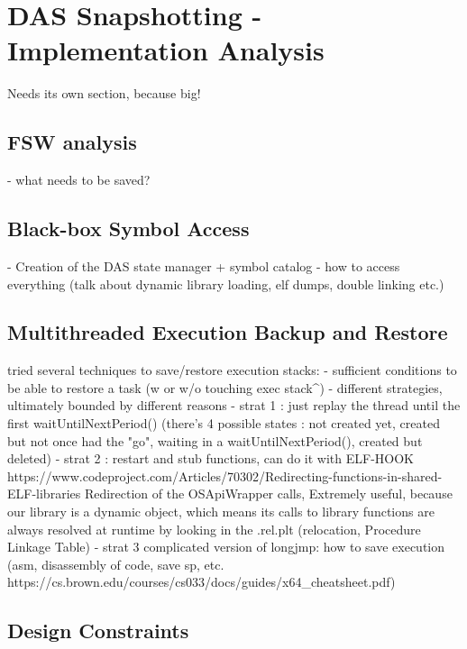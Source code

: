 {
\setlength{\parindent}{2em}
\chapter{DAS Snapshotting - Implementation Analysis}\label{cha:das-impl}
Needs its own section, because big!
\section{FSW analysis}
- what needs to be saved?
\section{Black-box Symbol Access}
- Creation of the DAS state manager + symbol catalog
- how to access everything (talk about dynamic library loading, elf dumps, double linking etc.)
\section{Multithreaded Execution Backup and Restore}
tried several techniques to save/restore execution stacks:
- sufficient conditions to be able to restore a task (w or w/o touching exec stack^)
- different strategies, ultimately bounded by different reasons 
- strat 1 : just replay the thread until the first waitUntilNextPeriod() (there's 4 possible states : not created yet, created but not once had the "go", waiting in a waitUntilNextPeriod(), created but deleted)
- strat 2 : restart and stub functions, can do it with ELF-HOOK https://www.codeproject.com/Articles/70302/Redirecting-functions-in-shared-ELF-libraries
	Redirection of the OSApiWrapper calls, Extremely useful, because our library is a dynamic object, which means its calls to library functions are always resolved at runtime by looking in the .rel.plt (relocation, Procedure Linkage Table)
- strat 3 complicated version of longjmp: how to save execution (asm, disassembly of code, save sp, etc. https://cs.brown.edu/courses/cs033/docs/guides/x64_cheatsheet.pdf)
\section{Design Constraints}

}